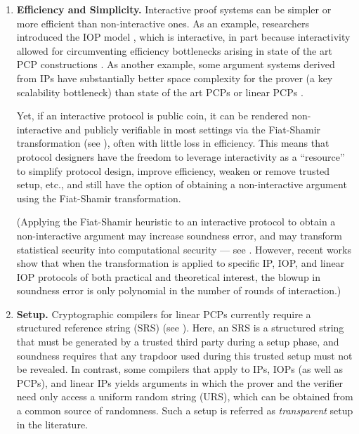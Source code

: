 \begin{enumerate}[label=\arabic*.] %
\item \textbf{Efficiency and Simplicity.} 
Interactive proof systems can be simpler or more efficient than non-interactive ones.
As an example, researchers introduced the IOP model \cite{2016:BCS:tcc:IOPs,2016:RRR:stoc:Constant-round-IP-for-Delegating-Computation}, which is interactive, in part because interactivity allowed for circumventing efficiency bottlenecks arising in state of the art PCP constructions \cite{2013:STOC:concrete-efficiency-PCPs}. 
As another example, some argument systems derived from IPs \cite{2018:SP:Doubly-efficient-zkSNARKs-without-trusted-setup, 2019:XZZPS:crypto:libra}
have substantially better space complexity for the prover (a key scalability bottleneck) than state of the art PCPs \cite{2013:STOC:concrete-efficiency-PCPs} or linear PCPs \cite{2013:GGPR:eurocrypt:QSPs-and-succinct-NIZKs-without-PCPs, 2016:Eurocrypt:On-the-Size-of-Pairing-Based-Non-interactive-Arguments}. 

Yet, if an interactive protocol is public coin, it can be rendered non-interactive and publicly verifiable in most settings via the Fiat-Shamir transformation (see ), often with little loss in efficiency.
This means that protocol designers have the freedom to leverage interactivity as a ``resource'' to simplify protocol design, improve efficiency, weaken or remove trusted setup, etc., and still have the option of obtaining a non-interactive argument using the Fiat-Shamir transformation.

(Applying the Fiat-Shamir heuristic to an interactive protocol to obtain a non-interactive argument may increase soundness error, and may transform statistical security into computational security --- see .
However, recent works \cite{2016:BCS:tcc:IOPs, 2019:STC:Fiat-Shamir-from-practice-to-theory} show that when the transformation is applied to specific IP, IOP, and linear IOP protocols of both practical and theoretical interest, the blowup in soundness error is only polynomial in the number of rounds of interaction.) 


\item \textbf{Setup.} 
Cryptographic compilers for linear PCPs currently require a structured reference string (SRS) (see ). 
Here, an SRS is a structured string that must be generated by a trusted third party during a setup phase, and soundness requires that any trapdoor used during this trusted setup must not be revealed. In contrast, some compilers that apply to IPs, IOPs (as well as PCPs), and linear IPs yields arguments in which the prover and the verifier need only access a uniform random string (URS), which can be obtained from a common source of randomness. Such a setup is referred as \emph{transparent} setup in the literature.


\end{enumerate}
